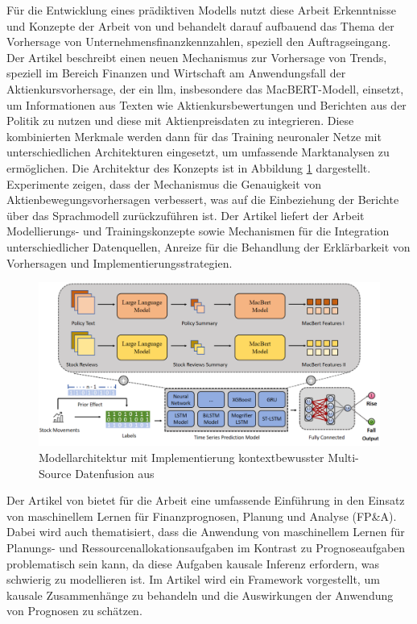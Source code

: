 \documentclass[lettersize,journal]{IEEEtran}
\begin{document}
Für die Entwicklung eines prädiktiven Modells nutzt diese Arbeit Erkenntnisse und Konzepte der Arbeit von  und behandelt darauf aufbauend das Thema der Vorhersage von Unternehmensfinanzkennzahlen, speziell den Auftragseingang. Der Artikel beschreibt einen neuen Mechanismus zur Vorhersage von Trends, speziell im Bereich Finanzen und Wirtschaft am Anwendungsfall der Aktienkursvorhersage, der ein \gls{llm}, insbesondere das MacBERT-Modell, einsetzt, um Informationen aus Texten wie Aktienkursbewertungen und Berichten aus der Politik zu nutzen und diese mit Aktienpreisdaten zu integrieren. Diese kombinierten Merkmale werden dann für das Training neuronaler Netze mit unterschiedlichen Architekturen eingesetzt, um umfassende Marktanalysen zu ermöglichen. Die Architektur des Konzepts ist in Abbildung \ref{fig:backgroundawaremultisourcefusion} dargestellt. Experimente zeigen, dass der Mechanismus die Genauigkeit von Aktienbewegungsvorhersagen verbessert, was auf die Einbeziehung der Berichte über das Sprachmodell zurückzuführen ist.
Der Artikel liefert der Arbeit Modellierungs- und Trainingskonzepte sowie Mechanismen für die Integration unterschiedlicher Datenquellen, Anreize für die Behandlung der Erklärbarkeit von Vorhersagen und Implementierungsstrategien.

\begin{figure}[h]
  \centering
  \includegraphics[width=\textwidth]{images/Architektur Background-Aware Multi-Source Fusion.png}
  \caption{Modellarchitektur mit Implementierung kontextbewusster Multi-Source Datenfusion aus \cite{mo2024backgroundawaremultisourcefusionfinancial}}
  \label{fig:backgroundawaremultisourcefusion}
\end{figure}

Der Artikel von  bietet für die Arbeit eine umfassende Einführung in den Einsatz von maschinellem Lernen für Finanzprognosen, Planung und Analyse (FP\&A). Dabei wird auch thematisiert, dass die Anwendung von maschinellem Lernen für Planungs- und Ressourcenallokationsaufgaben im Kontrast zu Prognoseaufgaben problematisch sein kann, da diese Aufgaben kausale Inferenz erfordern, was schwierig zu modellieren ist. Im Artikel wird ein Framework vorgestellt, um kausale Zusammenhänge zu behandeln und die Auswirkungen der Anwendung von Prognosen zu schätzen.
\end{document}
